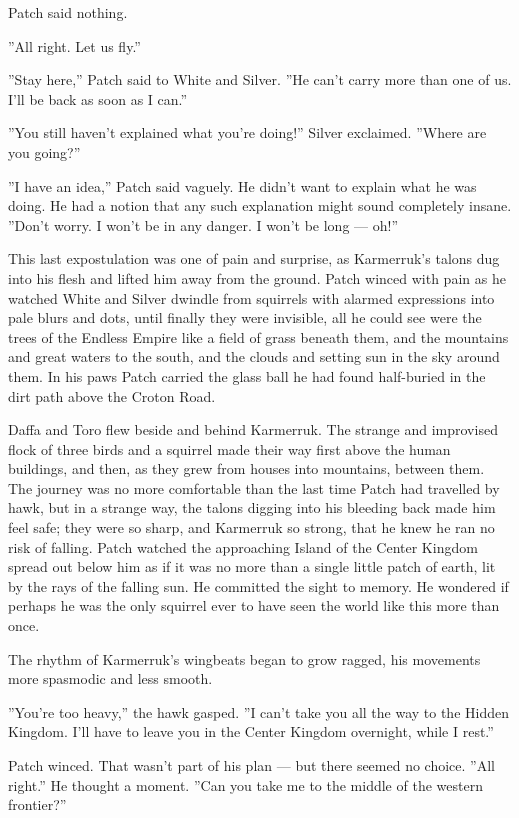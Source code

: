 \documentclass[12pt]{book}
\begin{document}
Patch said nothing.

''All right. Let us fly.''

''Stay here,'' Patch said to White and Silver. ''He can't carry more
than one of us. I'll be back as soon as I can.''

''You still haven't explained what you're doing!'' Silver
exclaimed. ''Where are you going?''

''I have an idea,'' Patch said vaguely. He didn't want to explain what
he was doing. He had a notion that any such explanation might sound
completely insane. ''Don't worry. I won't be in any danger. I won't be
long --- oh!''

This last expostulation was one of pain and surprise, as Karmerruk's
talons dug into his flesh and lifted him away from the ground. Patch
winced with pain as he watched White and Silver dwindle from squirrels
with alarmed expressions into pale blurs and dots, until finally they
were invisible, all he could see were the trees of the Endless Empire
like a field of grass beneath them, and the mountains and great waters
to the south, and the clouds and setting sun in the sky around
them. In his paws Patch carried the glass ball he had found
half-buried in the dirt path above the Croton Road.

Daffa and Toro flew beside and behind Karmerruk. The strange and
improvised flock of three birds and a squirrel made their way first
above the human buildings, and then, as they grew from houses into
mountains, between them. The journey was no more comfortable than the
last time Patch had travelled by hawk, but in a strange way, the
talons digging into his bleeding back made him feel safe; they were so
sharp, and Karmerruk so strong, that he knew he ran no risk of
falling. Patch watched the approaching Island of the Center Kingdom
spread out below him as if it was no more than a single little patch
of earth, lit by the rays of the falling sun. He committed the sight
to memory. He wondered if perhaps he was the only squirrel ever to
have seen the world like this more than once.

The rhythm of Karmerruk's wingbeats began to grow ragged, his
movements more spasmodic and less smooth.

''You're too heavy,'' the hawk gasped. ''I can't take you all the way
to the Hidden Kingdom. I'll have to leave you in the Center Kingdom
overnight, while I rest.''

Patch winced. That wasn't part of his plan --- but there seemed no
choice. ''All right.'' He thought a moment. ''Can you take me to the
middle of the western frontier?''
\end{document}

